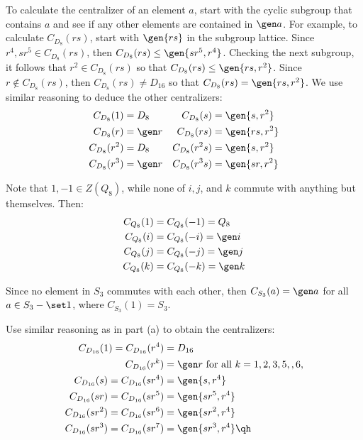 \begin{solalph}
    \item To calculate the centralizer of an element $a$, start with the cyclic subgroup that contains $a$ and see if any other elements are contained in $\gen a$. For example, to calculate $C_{D_8}(rs)$, start with $\gen{rs}$ in the subgroup lattice. Since $r^4, sr^5 \in C_{D_8}(rs)$, then $C_{D_8}(rs) \leq \gen{sr^5, r^4}$. Checking the next subgroup, it follows that $r^2 \in C_{D_8}(rs)$ so that $C_{D_8}(rs) \leq \gen{rs, r^2}$. Since $r \not\in C_{D_8}(rs)$, then $C_{D_8}(rs) \neq D_{16}$ so that $C_{D_8}(rs) = \gen{rs, r^2}$. We use similar reasoning to deduce the other centralizers:
    \begin{align*}
        C_{D_8}(1) & = D_8 & C_{D_8}(s) & = \gen{s, r^2} \\
        C_{D_8}(r) & = \gen r & C_{D_8}(rs) & = \gen{rs, r^2} \\
        C_{D_8}(r^2) & = D_8 & C_{D_8}(r^2s) & = \gen{s, r^2} \\
        C_{D_8}(r^3) & = \gen r & C_{D_8}(r^3s) & = \gen{sr, r^2}
    \end{align*}
    \item Note that $1, -1 \in Z(Q_8)$, while none of $i, j$, and $k$ commute with anything but themselves. Then:
    \begin{align*}
        C_{Q_8}(1) & = C_{Q_8}(-1) = Q_8 \\
        C_{Q_8}(i) & = C_{Q_8}(-i) = \gen i \\
        C_{Q_8}(j) & = C_{Q_8}(-j) = \gen j \\
        C_{Q_8}(k) & = C_{Q_8}(-k) = \gen k
    \end{align*}
    \item Since no element in $S_3$ commutes with each other, then $C_{S_3}(a) = \gen a$ for all $a \in S_3 - \set 1$, where $C_{S_3}(1) = S_3$.
    \item Use similar reasoning as in part (a) to obtain the centralizers:
    \begin{align*}
        C_{D_{16}}(1) = C_{D_{16}}(r^4) & = D_{16} \\
        C_{D_{16}}(r^k) & = \gen r \text{ for all $k = 1, 2, 3, 5, ,6, $} \\
        C_{D_{16}}(s) = C_{D_{16}}(sr^4) & = \gen{s, r^4} \\
        C_{D_{16}}(sr) = C_{D_{16}}(sr^5) & = \gen{sr^5, r^4} \\
        C_{D_{16}}(sr^2) = C_{D_{16}}(sr^6) & = \gen{sr^2, r^4} \\
        C_{D_{16}}(sr^3) = C_{D_{16}}(sr^7) & = \gen{sr^3, r^4} \qh
    \end{align*}
\end{solalph}


